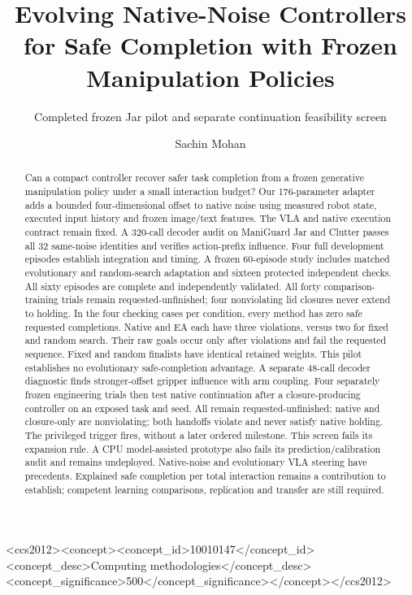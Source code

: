 \documentclass[sigconf,dvipsnames,balance=false]{acmart}
\begin{document}
\raggedbottom
\title{Evolving Native-Noise Controllers for Safe Completion with Frozen Manipulation Policies}
\subtitle{Completed frozen Jar pilot and separate continuation feasibility screen}
\author{Sachin Mohan}
\renewcommand{\shortauthors}{Mohan}
\begin{abstract}
Can a compact controller recover safer task completion from a frozen generative
manipulation policy under a small interaction budget? Our 176-parameter adapter
adds a bounded four-dimensional offset to native noise using measured robot state,
executed input history and frozen image/text features. The VLA and native execution
contract remain fixed. A 320-call decoder audit on ManiGuard Jar and Clutter
passes all 32 same-noise identities and verifies action-prefix influence. Four
full development episodes establish integration and timing. A frozen 60-episode
study includes matched evolutionary and random-search adaptation and sixteen
protected independent checks. All sixty episodes are complete and independently
validated. All forty comparison-training trials remain requested-unfinished;
four nonviolating lid closures never extend to holding. In the four checking
cases per condition, every method has zero safe requested completions. Native and
EA each have three violations, versus two for fixed and random search. Their
raw goals occur only after violations and fail the requested sequence. Fixed and
random finalists have identical retained weights. This pilot establishes no
evolutionary safe-completion advantage. A separate 48-call decoder diagnostic finds
stronger-offset gripper influence with arm coupling. Four separately frozen
engineering trials then test native continuation after a closure-producing
controller on an exposed task and seed. All remain requested-unfinished: native
and closure-only are nonviolating; both handoffs violate and never satisfy native
holding. The privileged trigger fires, without a later ordered milestone. This
screen fails its expansion rule. A CPU model-assisted prototype also fails its
prediction/calibration audit and remains undeployed. Native-noise and evolutionary
VLA steering have precedents. Explained
safe completion per total interaction remains a contribution to establish; competent
learning comparisons, replication and transfer are still required.
\end{abstract}
\begin{CCSXML}
<ccs2012><concept><concept_id>10010147</concept_id>
<concept_desc>Computing methodologies</concept_desc>
<concept_significance>500</concept_significance></concept></ccs2012>
\end{CCSXML}
\maketitle
\end{document}
